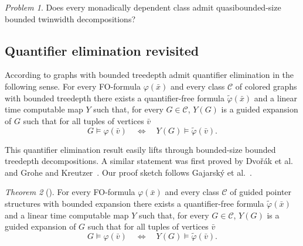 \documentclass[1p,number,a4paper]{elsarticle}
\theoremstyle{remark}
\newcommand{\Cc}{\mathscr{C}}
\renewcommand{\phi}{\varphi}
\newtheorem{theorem}{Theorem}[section]
\newtheorem{problem}[theorem]{Problem}
\begin{document}
\begin{problem}
  Does every monadically dependent class admit quasibounded-size bounded twinwidth decompositions?
\end{problem}


\subsection{Quantifier elimination revisited}

According to  graphs with bounded treedepth admit quantifier elimination in the following sense. 
    For every FO-formula $\varphi(\bar x)$ and every class $\Cc$ of colored graphs with bounded treedepth there exists a quantifier-free formula $\tilde\phi(\bar x)$ and a 
    linear time computable map $Y$ such that, for every $G\in\Cc$, $Y(G)$ is a guided expansion of $G$ such that for all tuples of vertices $\bar v$
	\[
	G\models \varphi(\bar v)\quad\iff\quad Y(G)\models\tilde\varphi(\bar v).
	\]

This quantifier elimination result easily lifts through bounded-size bounded treedepth decompositions. A similar statement was first proved by Dvo\v{r}\'ak et al.~\cite{dvovrak2013testing} and Grohe and Kreutzer~\cite{GroheK09}. 
Our proof sketch follows Gajarsk\'y et al.~\cite{gajarsky2020first}. 

\begin{theorem}[\cite{dvovrak2013testing,gajarsky2020first,GroheK09}]\label{thm:qe-BE}
    For every FO-formula $\varphi(\bar x)$ and every class $\Cc$ of guided pointer structures with bounded expansion there exists a quantifier-free formula $\tilde\phi(\bar x)$ and a 
    linear time computable map $Y$ such that, for every $G\in\Cc$, $Y(G)$ is a guided expansion of $G$ such that for all tuples of vertices $\bar v$
	\[
	G\models \varphi(\bar v)\quad\iff\quad Y(G)\models\tilde\varphi(\bar v).
	\]
\end{theorem}
\end{document}
